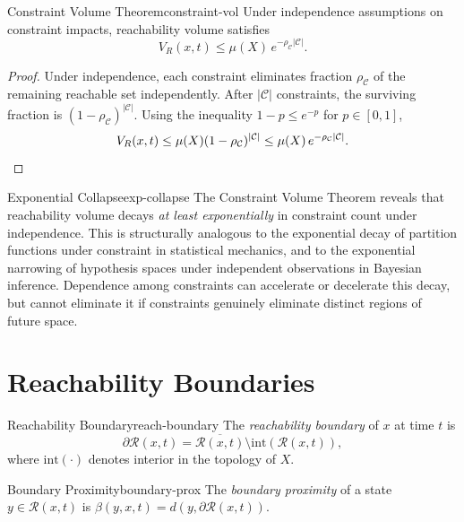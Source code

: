 \documentclass[12pt,twoside,openright]{book}
\newcommand{\reach}{\mathcal{R}}
\begin{document}
\begin{theorem}{Constraint Volume Theorem}{constraint-vol}
  Under independence assumptions on constraint impacts,
  reachability volume satisfies
  \[
    V_R(x,t) \le \mu(X)\, e^{-\rho_\mathcal{C}|\mathcal{C}|}.
  \]
\end{theorem}

\begin{proof}
  Under independence, each constraint eliminates fraction
  $\rho_\mathcal{C}$ of the remaining reachable set
  independently. After $|\mathcal{C}|$ constraints, the
  surviving fraction is
  $(1-\rho_\mathcal{C})^{|\mathcal{C}|}$. Using the
  inequality $1-p\le e^{-p}$ for $p\in[0,1]$,
  \[
    V_R(x,t)
    \le \mu(X)(1-\rho_\mathcal{C})^{|\mathcal{C}|}
    \le \mu(X)\,e^{-\rho_\mathcal{C}|\mathcal{C}|}. \qedhere
  \]
\end{proof}

\begin{remark}{Exponential Collapse}{exp-collapse}
  The Constraint Volume Theorem reveals that reachability
  volume decays \emph{at least exponentially} in constraint
  count under independence. This is structurally analogous
  to the exponential decay of partition functions under
  constraint in statistical mechanics, and to the
  exponential narrowing of hypothesis spaces under
  independent observations in Bayesian inference.
  Dependence among constraints can accelerate or decelerate
  this decay, but cannot eliminate it if constraints
  genuinely eliminate distinct regions of future space.
\end{remark}

\section{Reachability Boundaries}
\label{sec:ch13-boundary}

\begin{definition}{Reachability Boundary}{reach-boundary}
  The \emph{reachability boundary} of $x$ at time $t$ is
  \[
    \partial\reach(x,t)
    = \overline{\reach(x,t)} \setminus
      \mathrm{int}(\reach(x,t)),
  \]
  where $\mathrm{int}(\cdot)$ denotes interior in the
  topology of $X$.
\end{definition}

\begin{definition}{Boundary Proximity}{boundary-prox}
  The \emph{boundary proximity} of a state
  $y\in\reach(x,t)$ is
  $\beta(y,x,t) = d(y,\partial\reach(x,t))$.
\end{definition}
\end{document}
